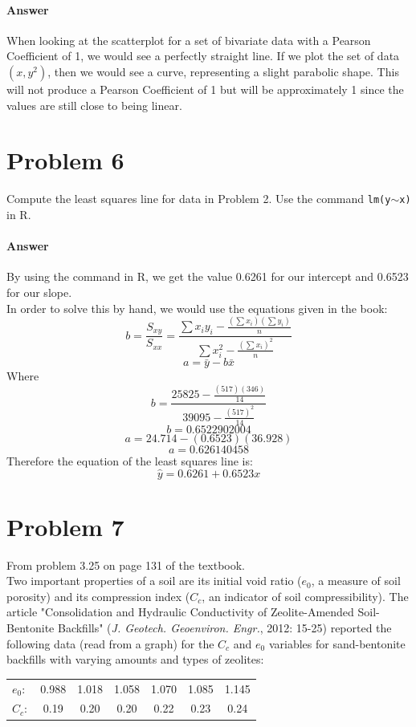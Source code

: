 \documentclass{article}
\newcommand{\code}[1]{\texttt{#1}} %
\newcommand{\p}[1]{\paragraph{#1}} %
\begin{document}
	\p{Answer} 
	When looking at the scatterplot for a set of bivariate data with a Pearson Coefficient of 1, we 
	would see a perfectly straight line. If we plot the set of data $(x,y^2)$, then we would see a 
	curve, representing a slight parabolic shape. This will not produce a Pearson Coefficient of 1 
	but will be approximately 1 since the values are still close to being linear.

\section*{Problem 6} %

	Compute the least squares line for data in Problem 2. Use the command \code{lm(y$\sim$x)} in 
	R.
	
	\p{Answer} By using the command in R, we get the value 0.6261 for our intercept and 0.6523 
	for our slope. \\
	
	In order to solve this by hand, we would use the equations given in the book:
	\[ b = \frac{S_{xy}}{S_{xx}} = \frac{\sum x_iy_i - \frac{(\sum x_i)(\sum y_i)}{n}}{\sum x_i^2 - 
	\frac{(\sum x_i)^2}{n}} \]
	\[ a = \bar{y} - b\bar{x} \]
	Where
	\[ b = \frac{ 25825 - \frac{(517)(346)}{14}}{39095 - \frac{(517)^2}{14}} \]
	\[ b = 0.6522902004 \]
	\[ a = 24.714 - (0.6523)(36.928) \]
	\[ a = 0.626140458 \]
	Therefore the equation of the least squares line is:
	\[ \hat{y} = 0.6261 + 0.6523 x \]
	
\clearpage
\section*{Problem 7} %

	From problem 3.25 on page 131 of the textbook. \\
	
	Two important properties of a soil are its initial void ratio ($e_0$, a measure of soil porosity) and 
	its compression index ($C_c$, an indicator of soil compressibility). The article "Consolidation 
	and Hydraulic Conductivity of Zeolite-Amended Soil-Bentonite Backfills" (\textit{J. Geotech. 
	Geoenviron. Engr.}, 2012: 15-25) reported the following data (read from a graph) for the $C_c$ 
	and $e_0$ variables for sand-bentonite backfills with varying amounts and types of zeolites:
	
	\begin{table}[!htb]
	\begin{tabular}{ l c c c c c c }
		$e_0:$ & 0.988 & 1.018 & 1.058 & 1.070 & 1.085 & 1.145 \\
		$C_c:$ & 0.19 & 0.20 & 0.20 & 0.22 & 0.23 & 0.24 \\
	\end{tabular}
	\end{table}
	
\end{document}
